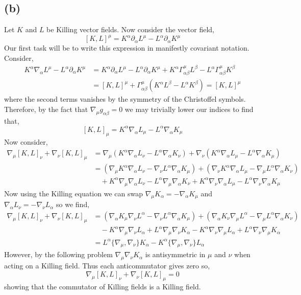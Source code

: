 \documentclass[12pt]{article}
\begin{document}
\subsection*{(b)}

Let $K$ and $L$ be Killing vector fields. Now consider the vector field,
\[ [K, L]^\mu = K^\alpha \partial_\alpha L^\mu - L^\alpha \partial_\alpha K^\mu \] 
Our first task will be to write this expression in manifestly covariant notation. Consider,
\begin{align*}
K^\alpha \nabla_\alpha L^\mu - L^\alpha \partial_\alpha K^\mu & = K^\alpha \partial_\alpha L^\mu - L^\alpha \partial_\alpha K^\mu + K^\alpha \Gamma^\mu_{\alpha \beta} L^\beta - L^\alpha \Gamma^\mu_{\alpha \beta} K^\beta
\\
& = [K, L]^\mu + \Gamma^\mu_{\alpha \beta} (K^\alpha L^\beta - L^\alpha K^\beta) = [K, L]^\mu
\end{align*}
where the second terms vanishes by the symmetry of the Christoffel symbols. Therefore, by the fact that $\nabla_\mu g_{\alpha \beta} = 0$ we may trivially lower our indices to find that,
\[ [K, L]_\mu = K^\alpha \nabla_\alpha L_\mu - L^\alpha \nabla_\alpha K_\mu \]
Now consider,
\begin{align*}
\nabla_\mu [K, L]_\nu + \nabla_\nu [K, L]_\mu & = \nabla_\mu (K^\alpha \nabla_\alpha L_\nu - L^\alpha \nabla_\alpha K_\nu) + \nabla_\nu (K^\alpha \nabla_\alpha L_\mu - L^\alpha \nabla_\alpha K_\mu) 
\\
& = (\nabla_\mu K^\alpha \nabla_\alpha L_\nu - \nabla_\nu L^\alpha \nabla_\alpha K_\mu) + (\nabla_\nu K^\alpha \nabla_\alpha L_\mu - \nabla_\mu L^\alpha \nabla_\alpha K_\nu)
\\
& \quad + K^\alpha \nabla_\mu \nabla_\alpha L_\nu - L^\alpha \nabla_\mu \nabla_\alpha K_\nu + K^\alpha \nabla_\nu \nabla_\alpha L_\mu - L^\alpha \nabla_\nu \nabla_\alpha K_\mu
\end{align*}
Now using the Killing equation we can swap $\nabla_\mu K_\alpha = - \nabla_\alpha K_\mu$ and $\nabla_\alpha L_\nu = - \nabla_\nu L_\alpha$ so we find,
\begin{align*}
\nabla_\mu [K, L]_\nu + \nabla_\nu [K, L]_\mu & = 
(\nabla_\alpha K_\mu \nabla_\nu L^\alpha - \nabla_\nu L^\alpha \nabla_\alpha K_\mu) + (\nabla_\alpha K_\nu \nabla_\mu L^\alpha - \nabla_\mu L^\alpha \nabla_\alpha K_\nu)
\\
& \quad - K^\alpha \nabla_\mu \nabla_\nu L_\alpha + L^\alpha \nabla_\mu \nabla_\nu K_\alpha - K^\alpha \nabla_\nu \nabla_\mu L_\alpha + L^\alpha \nabla_\nu \nabla_\mu K_\alpha
\\
& = L^\alpha \{ \nabla_\mu, \nabla_\nu \} K_\alpha - K^\alpha \{ \nabla_\mu, \nabla_\nu \} L_\alpha 
\end{align*}
However, by the following problem $\nabla_\mu \nabla_\nu K_\alpha$ is antisymmetric in $\mu$ and $\nu$ when acting on a Killing field. Thus each anticommutator gives zero so,
\[ \nabla_\mu [K, L]_\nu + \nabla_\nu [K, L]_\mu = 0 \]
showing that the commutator of Killing fields is a Killing field.
\end{document}
